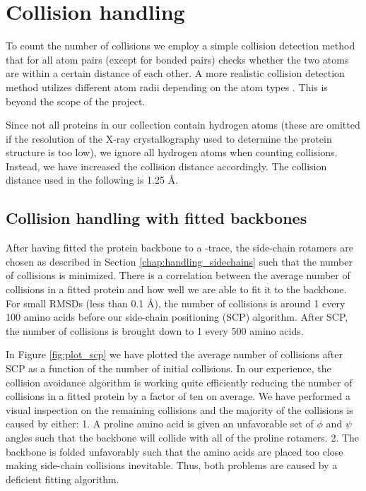 \section{Collision handling}
To count the number of collisions we employ a simple collision detection method that for all atom pairs (except for bonded pairs) checks whether the two atoms are within a certain distance of each other.
A more realistic collision detection method utilizes different atom radii depending on the atom types \cite{bondi1964van}. 
This is beyond the scope of the project.

Since not all proteins in our collection contain hydrogen atoms (these are omitted if the resolution of the X-ray crystallography used to determine the protein structure is too low), we ignore all hydrogen atoms when counting collisions.
Instead, we have increased the collision distance accordingly.
The collision distance used in the following is 1.25 Å.

\subsection{Collision handling with fitted backbones}
After having fitted the protein backbone to a \Ca-trace, the side-chain rotamers are chosen as described in Section \ref{chap:handling_sidechains} such that the number of collisions is minimized.
There is a correlation between the average number of collisions in a fitted protein and how well we are able to fit it to the backbone. 
For small RMSDs (less than 0.1 Å), the number of collisions is around 1 every 100 amino acids before our side-chain positioning (SCP) algorithm.
After SCP, the number of collisions is brought down to 1 every 500 amino acids.

In Figure \ref{fig:plot_scp} we have plotted the average number of collisions after SCP as a function of the number of initial collisions.
In our experience, the collision avoidance algorithm is working quite efficiently reducing the number of collisions in a fitted protein by a factor of ten on average. %
We have performed a visual inspection on the remaining collisions and the majority of the collisions is caused by either: 
1. A proline amino acid is given an unfavorable set of $\phi$ and $\psi$ angles such that the backbone will collide with all of the proline rotamers.
2. The backbone is folded unfavorably such that the amino acids are placed too close making side-chain collisions inevitable.
Thus, both problems are caused by a deficient fitting algorithm.

